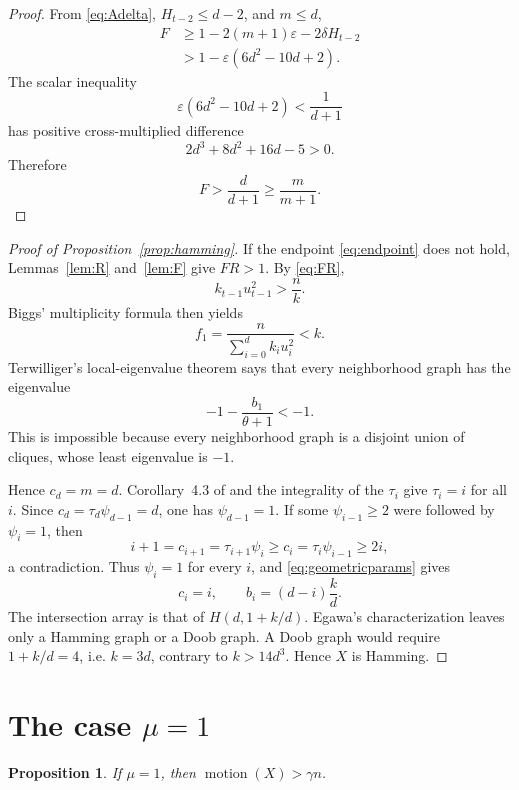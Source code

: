 \documentclass[11pt]{amsart}
\newtheorem{proposition}[theorem]{Proposition}
\theoremstyle{definition}
\newcommand{\mot}{\operatorname{motion}}
\newcommand{\eps}{\varepsilon}
\newcommand{\gam}{\gamma}
\begin{document}
\begin{proof}
From \eqref{eq:Adelta}, $H_{t-2}\le d-2$, and $m\le d$,
\begin{align*}
 F
 &\ge1-2(m+1)\eps-2\delta H_{t-2}\\
 &>1-\eps(6d^2-10d+2).
\end{align*}
The scalar inequality
\begin{equation}\label{eq:lossineq}
 \eps(6d^2-10d+2)<\frac1{d+1}
\end{equation}
has positive cross-multiplied difference
\[
 2d^3+8d^2+16d-5>0.
\]
Therefore
\[
 F>\frac{d}{d+1}\ge\frac{m}{m+1}.
\]
\end{proof}

\begin{proof}[Proof of Proposition~\ref{prop:hamming}]
If the endpoint \eqref{eq:endpoint} does not hold, Lemmas~\ref{lem:R} and~\ref{lem:F} give $FR>1$.  By \eqref{eq:FR},
\[
 k_{t-1}u_{t-1}^2>\frac nk.
\]
Biggs' multiplicity formula \cite[Theorem~2.10]{Kivva} then yields
\[
 f_1=\frac{n}{\sum_{i=0}^{d}k_i u_i^2}<k.
\]
Terwilliger's local-eigenvalue theorem \cite[Theorem~4.1]{Kivva} says that every neighborhood graph has the eigenvalue
\[
 -1-\frac{b_1}{\theta+1}<-1.
\]
This is impossible because every neighborhood graph is a disjoint union of cliques, whose least eigenvalue is $-1$.

Hence $c_d=m=d$.  Corollary~4.3 of \cite{Kivva} and the integrality of the $\tau_i$ give $\tau_i=i$ for all $i$.  Since
$c_d=\tau_d\psi_{d-1}=d$, one has $\psi_{d-1}=1$.  If some $\psi_{i-1}\ge2$ were followed by $\psi_i=1$, then
\[
 i+1=c_{i+1}=\tau_{i+1}\psi_i
 \ge c_i=\tau_i\psi_{i-1}\ge2i,
\]
a contradiction.  Thus $\psi_i=1$ for every $i$, and \eqref{eq:geometricparams} gives
\[
 c_i=i,
 \qquad
 b_i=(d-i)\frac{k}{d}.
\]
The intersection array is that of $H(d,1+k/d)$.  Egawa's characterization \cite[Theorem~2.24]{Kivva} leaves only a Hamming graph or a Doob graph.  A Doob graph would require $1+k/d=4$, i.e. $k=3d$, contrary to $k>14d^3$.  Hence $X$ is Hamming.
\end{proof}

\section{The case $\mu=1$}
\begin{proposition}\label{prop:mu1}
If $\mu=1$, then $\mot(X)>\gam n$.
\end{proposition}
\end{document}
